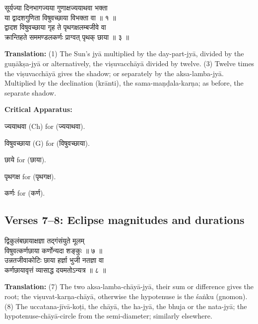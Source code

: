 \documentclass[11pt,a4paper]{article}
\newcommand{\dev}[1]{{\devanagarifont #1}}
\newcommand{\sanskritcol}[1]{%
  \begin{minipage}[t]{0.47\textwidth}
  \vspace{0pt}
  \begin{flushleft}
  #1
  \end{flushleft}
  \end{minipage}%
  \hfill
}
\newcommand{\englishcol}[1]{%
  \begin{minipage}[t]{0.47\textwidth}
  \vspace{0pt}
  \begin{flushleft}
  #1
  \end{flushleft}
  \end{minipage}%
}
\newenvironment{variants}{%
  \small%
  \color{varecolor}%
  \list{}{\leftmargin=2em\itemindent=-1em}%
}{\endlist}
\begin{document}
\noindent
\sanskritcol{\dev{सूर्यज्या दिनभागज्यया गुणाक्षज्ययाथवा भक्ता} \\ \dev{या द्वादशगुणिता विषुवच्छाया विभक्ता वा ॥ १ ॥} \\[0.2cm]
\dev{द्वादश विषुवच्छाया गृह ते पृथगक्षलम्बजीवे वा} \\ \dev{क्रान्तिहते सममण्डलकर्णः प्राग्वत् पृथक् छाया ॥ ३ ॥}}
\englishcol{\textbf{Translation:} (1) The Sun's jyā multiplied by the day-part-jyā, divided
by the guṇākṣa-jyā or alternatively, the viṣuvacchāyā divided by twelve. (3) Twelve
times the viṣuvacchāyā gives the shadow; or separately by the aksa-lamba-jyā.
Multiplied by the declination (krānti), the sama-maṇḍala-karṇa; as before, the
separate shadow.}

\vspace{0.4cm}
\textcolor{varecolor}{\textbf{Critical Apparatus:}}
\begin{variants}
\item[1.1] \dev{ज्ययाथवा} (Ch) \dev{for} (\dev{ज्ययाथवा}).
\item[1.2] \dev{विषुवच्छाया} (G) \dev{for} (\dev{विषुवच्छाया}).
\item[3.1] \dev{छाये} \dev{for} (\dev{छाया}).
\item[3.2] \dev{पृथगक्ष} \dev{for} (\dev{पृथगक्ष}).
\item[3.3] \dev{कर्णः} \dev{for} (\dev{कर्ण}).
\end{variants}

\subsection*{Verses 7--8: Eclipse magnitudes and durations}

\noindent
\sanskritcol{\dev{द्विकुलंबछायाक्षज्ञा तद्गंसंयुते मूलम्} \\ \dev{विषुवत्कर्णछाया कर्णोन्यदा शङ्कुः ॥ ७ ॥} \\[0.2cm]
\dev{उन्नतजीवाकोटिः छाया हर्ज्ञा भुजी नतज्ञा वा} \\ \dev{कर्णछायावृत्तं व्यासाद्ध दयमतोऽन्यत्र ॥ ८ ॥}}
\englishcol{\textbf{Translation:} (7) The two aksa-lamba-chāyā-jyā, their sum or difference gives
the root; the viṣuvat-karṇa-chāyā, otherwise the hypotenuse is the śaṅku (gnomon).
(8) The uccatana-jīvā-koṭi, the chāyā, the ha-jyā, the bhuja or the nata-jyā;
the hypotenuse-chāyā-circle from the semi-diameter; similarly elsewhere.}
\end{document}
